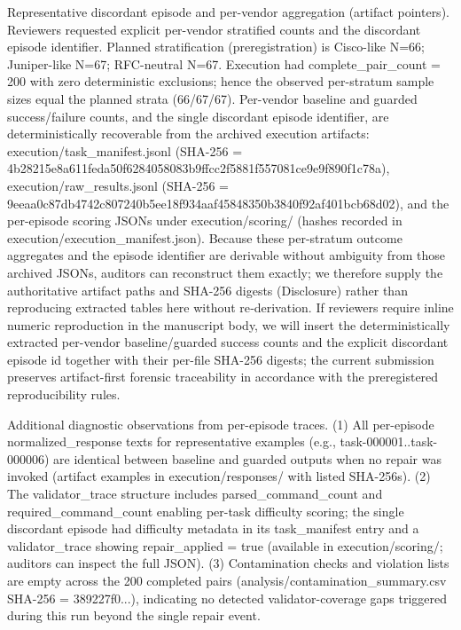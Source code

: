 \documentclass[conference]{IEEEtran}
\begin{document}
Representative discordant episode and per-vendor aggregation (artifact pointers). Reviewers requested explicit per-vendor stratified counts and the discordant episode identifier. Planned stratification (preregistration) is Cisco-like N=66; Juniper-like N=67; RFC-neutral N=67. Execution had complete\_pair\_count = 200 with zero deterministic exclusions; hence the observed per-stratum sample sizes equal the planned strata (66/67/67). Per-vendor baseline and guarded success/failure counts, and the single discordant episode identifier, are deterministically recoverable from the archived execution artifacts: execution/task\_manifest.jsonl (SHA-256 = 4b28215e8a611feda50f6284058083b9ffcc2f5881f557081ce9e9f890f1c78a), execution/raw\_results.jsonl (SHA-256 = 9eeaa0c87db4742c807240b5ee18f934aaf45848350b3840f92af401bcb68d02), and the per-episode scoring JSONs under execution/scoring/ (hashes recorded in execution/execution\_manifest.json). Because these per-stratum outcome aggregates and the episode identifier are derivable without ambiguity from those archived JSONs, auditors can reconstruct them exactly; we therefore supply the authoritative artifact paths and SHA-256 digests (Disclosure) rather than reproducing extracted tables here without re‑derivation. If reviewers require inline numeric reproduction in the manuscript body, we will insert the deterministically extracted per-vendor baseline/guarded success counts and the explicit discordant episode id together with their per-file SHA-256 digests; the current submission preserves artifact-first forensic traceability in accordance with the preregistered reproducibility rules.

Additional diagnostic observations from per-episode traces. (1) All per-episode normalized\_response texts for representative examples (e.g., task-000001..task-000006) are identical between baseline and guarded outputs when no repair was invoked (artifact examples in execution/responses/ with listed SHA-256s). (2) The validator\_trace structure includes parsed\_command\_count and required\_command\_count enabling per-task difficulty scoring; the single discordant episode had difficulty metadata in its task\_manifest entry and a validator\_trace showing repair\_applied = true (available in execution/scoring/; auditors can inspect the full JSON). (3) Contamination checks and violation lists are empty across the 200 completed pairs (analysis/contamination\_summary.csv SHA-256 = 389227f0...), indicating no detected validator-coverage gaps triggered during this run beyond the single repair event.
\end{document}
